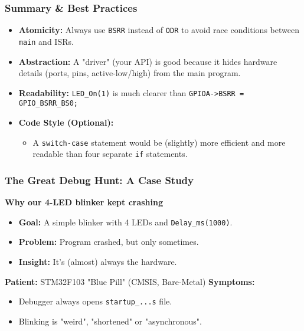 \documentclass{beamer}
\begin{document}
\begin{frame}
	\frametitle{Summary \& Best Practices}
	\begin{itemize}
		\item \textbf{Atomicity:} Always use \texttt{BSRR} instead of \texttt{ODR}
		to avoid race conditions between \texttt{main} and ISRs.
		\medskip
		\item \textbf{Abstraction:} A "driver" (your API) is good
		because it hides hardware details (ports, pins, active-low/high)
		from the main program.
		\medskip
		\item \textbf{Readability:} \texttt{LED\_On(1)} is much clearer than
		\texttt{GPIOA->BSRR = GPIO\_BSRR\_BS0;}
		\medskip
		\item \textbf{Code Style (Optional):}
		\begin{itemize}
			\item A \texttt{switch-case} statement would be (slightly)
			more efficient and more readable than four separate \texttt{if} statements.
		\end{itemize}
	\end{itemize}
\end{frame}
\begin{frame}
	\frametitle{The Great Debug Hunt: A Case Study}
	\textbf{Why our 4-LED blinker kept crashing}
	\medskip
	\begin{itemize}
		\item \textbf{Goal:} A simple blinker with 4 LEDs and \texttt{Delay\_ms(1000)}.
		\item \textbf{Problem:} Program crashed, but only sometimes.
		\item \textbf{Insight:} It's (almost) always the hardware.
	\end{itemize}
	\bigskip
	\textbf{Patient:} STM32F103 "Blue Pill" (CMSIS, Bare-Metal)
	\bigskip
	\textbf{Symptoms:}
	\begin{itemize}
		\item Debugger always opens \texttt{startup\_...s} file.
		\item Blinking is "weird", "shortened" or "asynchronous".
	\end{itemize}
\end{frame}
\end{document}

